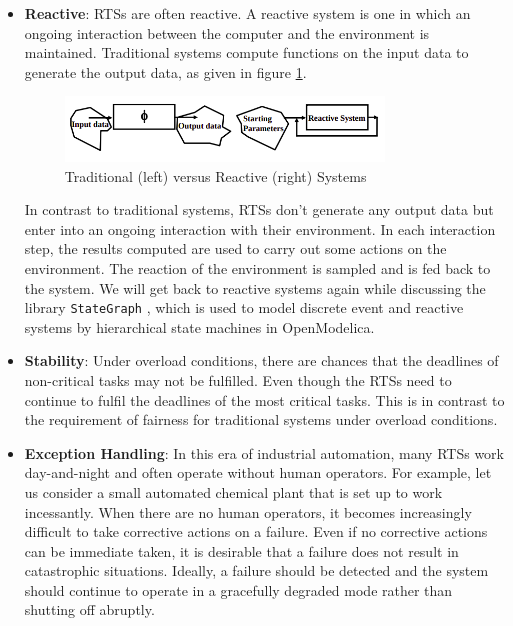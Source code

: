\documentclass[12pt]{report}
\begin{document}
\begin{itemize}
    \item \textbf{Reactive}: RTSs are often reactive. A reactive system is one in which an ongoing interaction between the computer and the environment is maintained. Traditional systems compute functions on the input data to generate the output data, as given in figure \ref{fig:trad-reac}.
    \begin{figure}[h]
    \centering
    \includegraphics[width=0.8\textwidth]{images/trad-vs-reac.png}
    \caption{Traditional (left) versus Reactive (right) Systems}
    \label{fig:trad-reac}
    \end{figure}
    
    In contrast to traditional systems, RTSs don't generate any output data but enter into an ongoing interaction with their environment. In each interaction step, the results computed are used to carry out some actions on the environment. The reaction of the environment is sampled and is fed back to the system. We will get back to reactive systems again while discussing the library \texttt{StateGraph} \cite{stategraph}, which is used to model discrete event and reactive systems by hierarchical state machines in OpenModelica. 
    \item \textbf{Stability}: Under overload conditions, there are chances that the deadlines of non-critical tasks may not be fulfilled. Even though the RTSs need to continue to fulfil the deadlines of the most critical tasks. This is in contrast to the requirement of fairness for traditional systems under overload conditions. 
    \item \textbf{Exception Handling}: In this era of industrial automation, many RTSs work day-and-night and often operate without human operators. For example, let us consider a small automated chemical plant that is set up to work incessantly. When there are no human operators, it becomes increasingly difficult to take corrective actions on a failure. Even if no corrective actions can be immediate taken, it is desirable that a failure does not result in catastrophic situations. Ideally, a failure should be detected and the system should continue to operate in a gracefully degraded mode rather than shutting off abruptly. 
\end{itemize}
\end{document}
